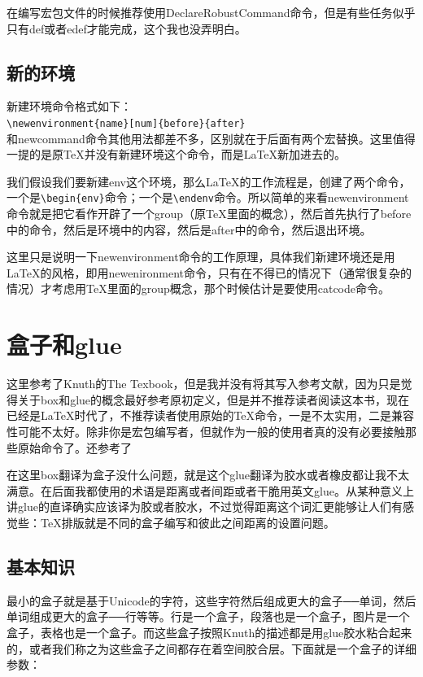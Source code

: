 \documentclass[12pt,oneside]{book}
\begin{document}
\begin{common-format}
在编写宏包文件的时候推荐使用DeclareRobustCommand命令，但是有些任务似乎只有def或者edef才能完成，这个我也没弄明白。




\subsection{新的环境}
\label{sec:新的环境}
新建环境命令格式如下：\\
\verb+\newenvironment{name}[num]{before}{after}+\\
和newcommand命令其他用法都差不多，区别就在于后面有两个宏替换。这里值得一提的是原\TeX 并没有新建环境这个命令，而是\LaTeX 新加进去的。

我们假设我们要新建env这个环境，那么\LaTeX 的工作流程是，创建了两个命令，一个是\verb+\begin{env}+命令；一个是\verb+\endenv+命令。所以简单的来看newenvironment命令就是把它看作开辟了一个group（原\TeX 里面的概念），然后首先执行了before中的命令，然后是环境中的内容，然后是after中的命令，然后退出环境。

这里只是说明一下newenvironment命令的工作原理，具体我们新建环境还是用\LaTeX 的风格，即用newenironment命令，只有在不得已的情况下（通常很复杂的情况）才考虑用\TeX 里面的group概念，那个时候估计是要使用catcode命令。



\section{盒子和glue}
\label{sec:盒子和glue}
\begin{flushright}
\begin{notecard}[olive!30]{20em}
这里参考了Knuth的The Texbook，但是我并没有将其写入参考文献，因为只是觉得关于box和glue的概念最好参考原初定义，但是并不推荐读者阅读这本书，现在已经是\LaTeX 时代了，不推荐读者使用原始的\TeX 命令，一是不太实用，二是兼容性可能不太好。除非你是宏包编写者，但就作为一般的使用者真的没有必要接触那些原始命令了。还参考了\cite{boxes}
\end{notecard}
\end{flushright}

在这里box翻译为盒子没什么问题，就是这个glue翻译为胶水或者橡皮都让我不太满意。在后面我都使用的术语是距离或者间距或者干脆用英文glue。从某种意义上讲glue的直译确实应该译为胶或者胶水，不过觉得距离这个词汇更能够让人们有感觉些：\TeX 排版就是不同的盒子编写和彼此之间距离的设置问题。

\subsection{基本知识}
最小的盒子就是基于Unicode的字符，这些字符然后组成更大的盒子──单词，然后单词组成更大的盒子──行等等。行是一个盒子，段落也是一个盒子，图片是一个盒子，表格也是一个盒子。而这些盒子按照Knuth的描述都是用glue胶水粘合起来的，或者我们称之为这些盒子之间都存在着空间胶合层。下面就是一个盒子的详细参数：


\end{common-format}
\end{document}
